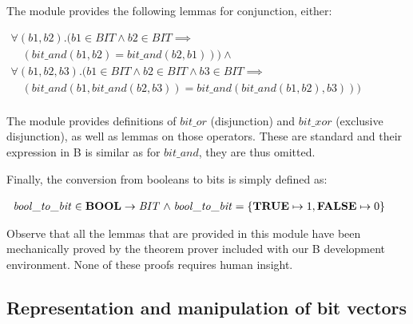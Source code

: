 \documentclass[11pt]{article} %
\begin{document}
The module provides the following lemmas for conjunction, either:

$
\begin{array}{l}
\forall (\mathit{b1},\mathit{b2}).(\mathit{b1} \in \mathit{BIT} \land \mathit{b2} \in \mathit{BIT} \implies \\
\quad (\mathit{bit\_and}(\mathit{b1}, \mathit{b2}) = \mathit{bit\_and}(\mathit{b2},\mathit{b1})))\land \\
\forall (\mathit{b1},\mathit{b2},\mathit{b3}).(\mathit{b1} \in \mathit{BIT} \land  \mathit{b2} \in \mathit{BIT} \land \mathit{b3} \in \mathit{BIT} \implies \\
\quad (\mathit{bit\_and}(\mathit{b1}, \mathit{bit\_and}(\mathit{b2},\mathit{b3})) = \mathit{bit\_and}(\mathit{bit\_and}(\mathit{b1},\mathit{b2}),\mathit{b3})))\\
\end{array}
$

The module provides definitions of $\mathit{bit\_or}$ (disjunction)
and $\mathit{bit\_xor}$ (exclusive disjunction), as well as lemmas on
those operators. These are standard and their expression in B is
similar as for $\mathit{bit\_and}$, they are thus omitted.

Finally, the conversion from booleans to bits is simply defined as:

$
\begin{array}{l}
\mathit{bool\_to\_bit} \in \operatorname{\mathbf{BOOL}} \rightarrow \mathit{BIT} \mathrel{\wedge} \mathit{bool\_to\_bit} = \{ \operatorname{\mathbf{TRUE}} \mapsto 1, \operatorname{\mathbf{FALSE}} \mapsto 0 \} \\
\end{array}
$

Observe that all the lemmas that are provided in this module have been
mechanically proved by the theorem prover included with our B
development environment. None of these proofs requires human insight.


\subsection{Representation and manipulation of bit vectors}
\end{document}
